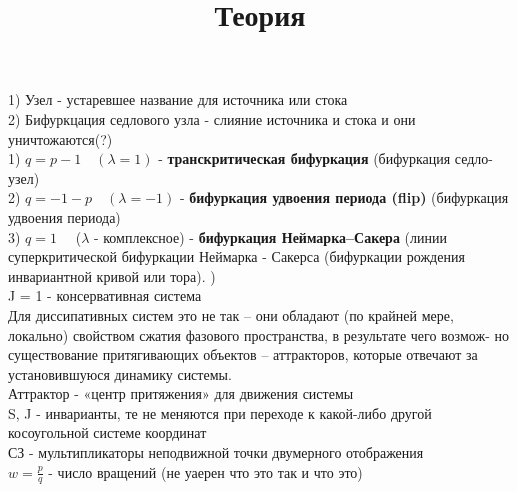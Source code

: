 \documentclass[fleqn]{article}
\begin{document}
\title{Теория}
1) Узел - устаревшее название для источника или стока \\
2) Бифуркцация седлового узла - слияние источника и стока и они уничтожаются(?)\\
   1) $ q = p - 1 \quad (\lambda = 1)$ - \textbf{транскритическая бифуркация} (бифуркация седло-узел)\\
   2) $ q = -1 - p \quad (\lambda = -1)$ - \textbf{бифуркация удвоения периода (flip)} (бифуркация удвоения периода)\\
   3) $ q = 1 \quad $ ($\lambda$ - комплексное) - \textbf{бифуркация Неймарка–Сакера} (линии суперкритической бифуркации
Неймарка - Сакерса (бифуркации рождения инвариантной кривой или тора). )\\
J = 1 - консервативная система \\
Для диссипативных систем это не так – они обладают (по крайней мере,
локально) свойством сжатия фазового пространства, в результате чего возмож-
но существование притягивающих объектов – аттракторов, которые отвечают
за установившуюся динамику системы. \\
Аттрактор - «центр притяжения» для движения системы \\
S, J - инварианты, те не меняются при переходе к какой-либо другой косоугольной системе
координат \\
СЗ - мультипликаторы неподвижной точки двумерного отображения\\
$ w = \frac{p}{q} $ - число вращений (не уаерен что это так и что это) \\
\end{document}
